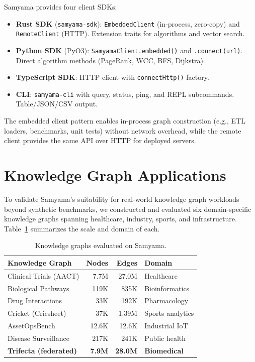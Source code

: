 \documentclass[sigconf, nonacm]{acmart}
\begin{document}
Samyama provides four client SDKs:

\begin{itemize}[leftmargin=*]
  \item \textbf{Rust SDK} (\texttt{samyama-sdk}): \texttt{EmbeddedClient} (in-process, zero-copy) and \texttt{RemoteClient} (HTTP). Extension traits for algorithms and vector search.
  \item \textbf{Python SDK} (PyO3): \texttt{SamyamaClient.embedded()} and \texttt{.connect(url)}. Direct algorithm methods (PageRank, WCC, BFS, Dijkstra).
  \item \textbf{TypeScript SDK}: HTTP client with \texttt{connectHttp()} factory.
  \item \textbf{CLI}: \texttt{samyama-cli} with query, status, ping, and REPL subcommands. Table/JSON/CSV output.
\end{itemize}

\noindent
The embedded client pattern enables in-process graph construction (e.g., ETL loaders, benchmarks, unit tests) without network overhead, while the remote client provides the same API over HTTP for deployed servers.

\section{Knowledge Graph Applications}
\label{sec:applications}

To validate Samyama's suitability for real-world knowledge graph workloads beyond synthetic benchmarks, we constructed and evaluated six domain-specific knowledge graphs spanning healthcare, industry, sports, and infrastructure.
Table~\ref{tab:kgs} summarizes the scale and domain of each.

\begin{table}[!htbp]
\caption{Knowledge graphs evaluated on Samyama.}
\label{tab:kgs}
\begin{tabular}{lrrl}
\toprule
\textbf{Knowledge Graph} & \textbf{Nodes} & \textbf{Edges} & \textbf{Domain} \\
\midrule
Clinical Trials (AACT) & 7.7M & 27.0M & Healthcare \\
Biological Pathways & 119K & 835K & Bioinformatics \\
Drug Interactions & 33K & 192K & Pharmacology \\
Cricket (Cricsheet) & 37K & 1.39M & Sports analytics \\
AssetOpsBench & 12.6K & 12.6K & Industrial IoT \\
Disease Surveillance & 217K & 241K & Public health \\
\midrule
\textbf{Trifecta (federated)} & \textbf{7.9M} & \textbf{28.0M} & \textbf{Biomedical} \\
\bottomrule
\end{tabular}
\end{table}
\end{document}
